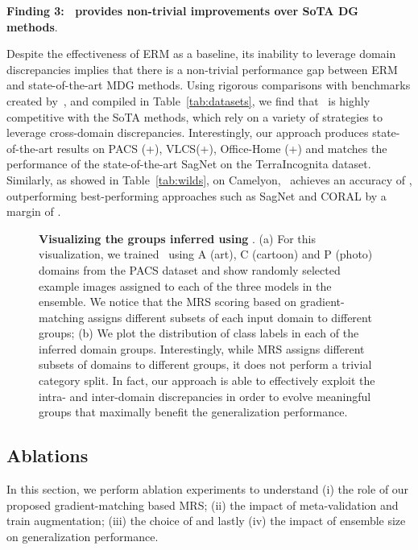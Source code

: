 \vspace{0.05in}
\noindent\textbf{Finding 3: \muld~provides non-trivial improvements over SoTA DG methods}. 

\noindent Despite the effectiveness of ERM as a baseline, its inability to leverage domain discrepancies implies that there is a non-trivial performance gap between ERM and state-of-the-art MDG methods. Using rigorous comparisons with benchmarks created by~\citep{gulrajani2020search}, and compiled in Table~\ref{tab:datasets}, we find that \muld~is highly competitive with the SoTA methods, which rely on a variety of strategies to leverage cross-domain discrepancies. Interestingly, our approach produces state-of-the-art results on PACS (+), VLCS(+), Office-Home (+) and matches the performance of the state-of-the-art SagNet on the TerraIncognita dataset. Similarly, as showed in Table~\ref{tab:wilds}, on Camelyon, \muld~achieves an accuracy of , outperforming best-performing approaches such as SagNet and CORAL by a margin of .

\begin{figure*}[h]
    \centering
    
    
    \caption{\textbf{Visualizing the groups inferred using \muld}. (a) For this visualization, we trained \muld~using A (art), C (cartoon) and P (photo) domains from the PACS dataset and show randomly selected example images assigned to each of the three models in the ensemble. We notice that the MRS scoring based on gradient-matching assigns different subsets of each input domain to different groups; (b) We plot the distribution of class labels in each of the inferred domain groups. Interestingly, while MRS assigns different subsets of domains to different groups, it does not perform a trivial category split. In fact, our approach is able to effectively exploit the intra- and inter-domain discrepancies in order to evolve meaningful groups that maximally benefit the generalization performance.}
    \label{fig:groups}
\end{figure*}




\subsection{Ablations}
\label{sec:ablation}
In this section, we perform ablation experiments to understand (i) the role of our proposed gradient-matching based MRS; (ii) the impact of meta-validation and train augmentation; (iii) the choice of  and lastly (iv) the impact of ensemble size on generalization performance.

